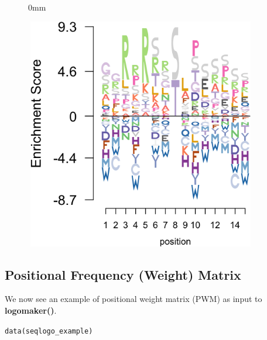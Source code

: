 \documentclass[12pt]{article}\usepackage[]{graphicx}\usepackage[usenames,dvipsnames]{color}
\newcommand{\hlstr}[1]{\textcolor[rgb]{0.251,0.627,0.251}{#1}}%
\newcommand{\hlopt}[1]{\textcolor[rgb]{0,0,0}{#1}}%
\newcommand{\hlstd}[1]{\textcolor[rgb]{0.251,0.251,0.251}{#1}}%
\newcommand{\hlkwb}[1]{\textcolor[rgb]{0,0,0}{#1}}%
\newcommand{\hlkwc}[1]{\textcolor[rgb]{0.251,0.251,0.251}{#1}}%
\newcommand{\hlkwd}[1]{\textcolor[rgb]{0.878,0.439,0.125}{#1}}%
\newenvironment{knitrout}{}{} %
\begin{document}
\begin{figure}[h]
\begin{center}
\begin{knitrout}
\color{fgcolor}\begin{adjustwidth}{\fltoffset}{0mm}

\includegraphics[width=4in,height=4in]{figure/ED_logo_2-1} \hfill{}

\end{adjustwidth}
\end{knitrout}
\end{center}
\end{figure}


\newpage
\subsection{Positional Frequency (Weight) Matrix}

We now see an example of positional weight matrix (PWM) as input to \textbf{logomaker()}.

\begin{knitrout}
\color{fgcolor}\begin{kframe}
\begin{alltt}
\hlkwd{data}\hlstd{(seqlogo_example)}
\end{alltt}
\end{kframe}
\end{knitrout}
\end{document}
